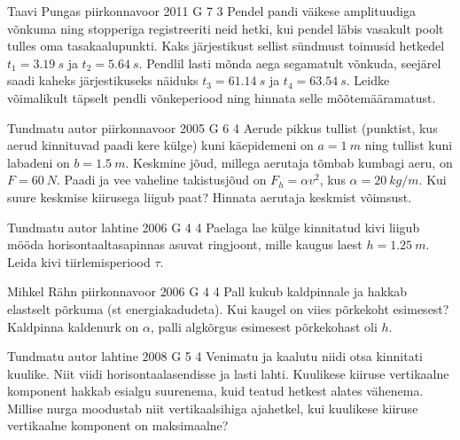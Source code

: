 \documentclass[11pt]{article}
\begin{document}
{%
{Taavi Pungas} %
{piirkonnavoor} %
{2011} %
{G 7} %
{3} %
{
\ifStatement
Pendel pandi väikese amplituudiga võnkuma ning stopperiga registreeriti neid hetki, kui pendel läbis vasakult poolt tulles oma tasakaalupunkti. Kaks järjestikust sellist sündmust toimusid hetkedel $t_1=\SI{3,19}{s}$ ja $t_2=\SI{5,64}{s}$. Pendlil lasti mõnda aega segamatult võnkuda, seejärel saadi kaheks järjestikuseks näiduks $t_3=\SI{61,14}{s}$ ja $t_4=\SI{63,54}{s}$. Leidke võimalikult täpselt pendli võnkeperiood ning hinnata selle mõõtemääramatust.
\fi
}

{Tundmatu autor} %
{piirkonnavoor} %
{2005} %
{G 6} %
{4} %
{
\ifStatement
Aerude pikkus tullist (punktist, kus aerud kinnituvad paadi kere külge) kuni käepidemeni on $a = \SI{1}{m}$ ning tullist kuni labadeni on $b = \SI{1,5}{m}$. Keskmine jõud, millega aerutaja tõmbab kumbagi aeru, on $F = \SI{60}{N}$. Paadi ja vee vaheline takistusjõud on $F_h = \alpha v^2$, kus $\alpha = \SI{20}{kg/m}$. Kui suure keskmise kiirusega liigub paat? Hinnata aerutaja keskmist võimsust.
\fi
}

{Tundmatu autor} %
{lahtine} %
{2006} %
{G 4} %
{4} %
{
\ifStatement
Paelaga lae külge kinnitatud kivi liigub mööda horisontaaltasapinnas asuvat ringjoont, mille kaugus laest $h = \SI{1,25}{m}$. Leida kivi tiirlemisperiood $\tau$. 
\fi
}

{Mihkel Rähn} %
{piirkonnavoor} %
{2006} %
{G 4} %
{4} %
{
\ifStatement
Pall kukub kaldpinnale ja hakkab elastselt põrkuma (st energiakadudeta). Kui kaugel on viies põrkekoht esimesest? Kaldpinna kaldenurk on $\alpha$, palli algkõrgus esimesest põrkekohast oli $h$.
\fi
}

{Tundmatu autor} %
{lahtine} %
{2008} %
{G 5} %
{4} %
{
\ifStatement
Venimatu ja kaalutu niidi otsa kinnitati kuulike.
Niit viidi horisontaalasendisse ja lasti lahti. Kuulikese kiiruse vertikaalne komponent
hakkab esialgu suurenema, kuid teatud hetkest alates vähenema. Millise nurga moodustab niit vertikaalsihiga ajahetkel, kui kuulikese kiiruse vertikaalne komponent on
maksimaalne?
\fi
}

}
\end{document}
